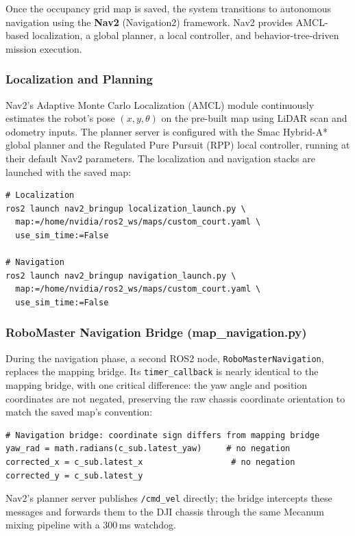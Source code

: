 Once the occupancy grid map is saved, the system transitions to autonomous navigation using the \textbf{Nav2} (Navigation2) framework. Nav2 provides AMCL-based localization, a global planner, a local controller, and behavior-tree-driven mission execution.

\subsubsection{Localization and Planning}

Nav2's Adaptive Monte Carlo Localization (AMCL) module continuously estimates the robot's pose $(x, y, \theta)$ on the pre-built map using LiDAR scan and odometry inputs. The planner server is configured with the Smac Hybrid-A* global planner and the Regulated Pure Pursuit (RPP) local controller, running at their default Nav2 parameters. The localization and navigation stacks are launched with the saved map:

\begin{verbatim}
# Localization
ros2 launch nav2_bringup localization_launch.py \
  map:=/home/nvidia/ros2_ws/maps/custom_court.yaml \
  use_sim_time:=False

# Navigation
ros2 launch nav2_bringup navigation_launch.py \
  map:=/home/nvidia/ros2_ws/maps/custom_court.yaml \
  use_sim_time:=False
\end{verbatim}

\subsubsection{RoboMaster Navigation Bridge (map\_navigation.py)}

During the navigation phase, a second ROS2 node, \texttt{RoboMasterNavigation}, replaces the mapping bridge. Its \texttt{timer\_callback} is nearly identical to the mapping bridge, with one critical difference: the yaw angle and position coordinates are not negated, preserving the raw chassis coordinate orientation to match the saved map's convention:

\begin{verbatim}
# Navigation bridge: coordinate sign differs from mapping bridge
yaw_rad = math.radians(c_sub.latest_yaw)     # no negation
corrected_x = c_sub.latest_x                  # no negation
corrected_y = c_sub.latest_y
\end{verbatim}

Nav2's planner server publishes \texttt{/cmd\_vel} directly; the bridge intercepts these messages and forwards them to the DJI chassis through the same Mecanum mixing pipeline with a 300\,ms watchdog.

